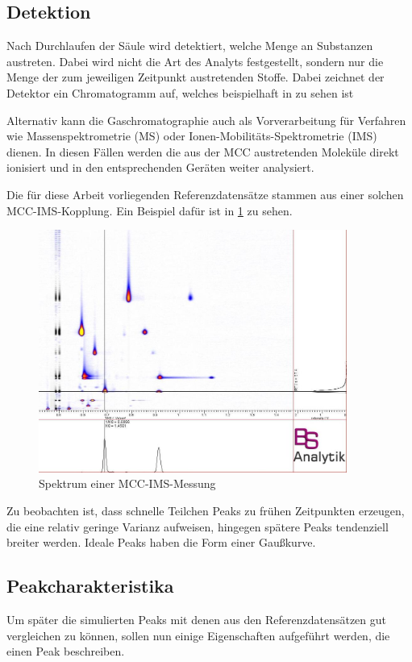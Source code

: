 \subsection{Detektion}
Nach Durchlaufen der Säule wird detektiert, welche Menge an Substanzen austreten. Dabei wird nicht die Art des Analyts festgestellt, sondern nur die Menge der zum jeweiligen Zeitpunkt austretenden Stoffe. Dabei zeichnet der Detektor ein Chromatogramm auf, welches beispielhaft in  zu sehen ist

Alternativ kann die Gaschromatographie auch als Vorverarbeitung für Verfahren wie Massenspektrometrie (MS) oder Ionen-Mobilitäts-Spektrometrie (IMS) dienen. In diesen Fällen werden die aus der MCC austretenden Moleküle direkt ionisiert und in den entsprechenden Geräten weiter analysiert.

Die für diese Arbeit vorliegenden Referenzdatensätze stammen aus einer solchen MCC-IMS-Kopplung. Ein Beispiel dafür ist in \ref{picture:Spektrum1} zu sehen. 
\begin{figure}
 \includegraphics[width = 0.9\textwidth]{bilder/BD15_1304101102_ims}
 \caption{Spektrum einer MCC-IMS-Messung}
 \label{picture:Spektrum1}
\end{figure}
%
Zu beobachten ist, dass schnelle Teilchen Peaks zu frühen Zeitpunkten erzeugen, die eine relativ geringe Varianz aufweisen, hingegen spätere Peaks tendenziell breiter werden. Ideale Peaks haben die Form einer Gaußkurve.


\subsection{Peakcharakteristika}
Um später die simulierten Peaks mit denen aus den Referenzdatensätzen gut vergleichen zu können, sollen nun einige Eigenschaften aufgeführt werden, die einen Peak beschreiben.

